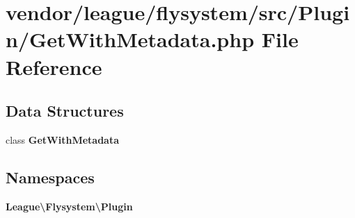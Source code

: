 \section{vendor/league/flysystem/src/\+Plugin/\+Get\+With\+Metadata.php File Reference}
\label{_get_with_metadata_8php}
\subsection*{Data Structures}
\begin{DoxyCompactItemize}
\item 
class {\bf Get\+With\+Metadata}
\end{DoxyCompactItemize}
\subsection*{Namespaces}
\begin{DoxyCompactItemize}
\item 
 {\bf League\textbackslash{}\+Flysystem\textbackslash{}\+Plugin}
\end{DoxyCompactItemize}
